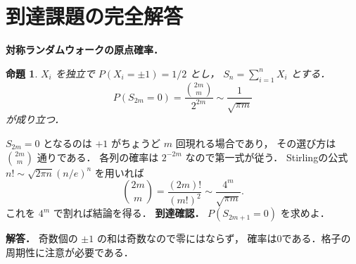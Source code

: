 \documentclass[a5paper,10pt,onecolumn]{jsarticle}
\makeatletter
\theoremstyle{mathnotetheorem}
\newtheorem{proposition}[theorem]{命題}
\renewcommand{\proofname}{証明}
\renewenvironment{proof}[1][\proofname]{%
  \par\pushQED{\qed}\normalfont\topsep4\p@\@plus2\p@\relax
  \trivlist\item[\hskip\labelsep\bfseries #1]\ignorespaces
}{\popQED\endtrivlist\@endpefalse}
\makeatother
\begin{document}
\section{到達課題の完全解答}
\noindent\textbf{対称ランダムウォークの原点確率．}
\begin{proposition}
$X_i$ を独立で $P(X_i=\pm1)=1/2$ とし，
$S_n=\sum_{i=1}^nX_i$ とする．
\[
P(S_{2m}=0)=\frac{\binom{2m}m}{2^{2m}}
\sim\frac1{\sqrt{\pi m}}
\]
が成り立つ．
\end{proposition}
\begin{proof}
$S_{2m}=0$ となるのは
$+1$ がちょうど $m$ 回現れる場合であり，
その選び方は $\binom{2m}m$ 通りである．
各列の確率は $2^{-2m}$ なので第一式が従う．
Stirlingの公式
$n!\sim\sqrt{2\pi n}(n/e)^n$ を用いれば
\[
\binom{2m}m
=\frac{(2m)!}{(m!)^2}
\sim\frac{4^m}{\sqrt{\pi m}}.
\]
これを $4^m$ で割れば結論を得る．
\end{proof}
\noindent\textbf{到達確認．}
$P(S_{2m+1}=0)$ を求めよ．
\par\noindent\textbf{解答．}
奇数個の $\pm1$ の和は奇数なので零にはならず，
確率は0である．格子の周期性に注意が必要である．
\end{document}
